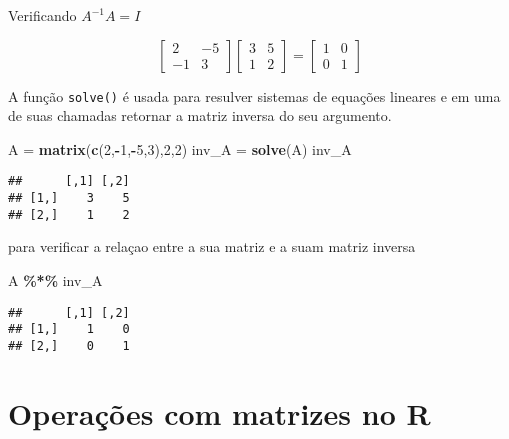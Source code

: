 \documentclass[
]{book}
\newenvironment{Shaded}{\begin{snugshade}}{\end{snugshade}}
\newcommand{\DecValTok}[1]{\textcolor[rgb]{0.00,0.00,0.81}{#1}}
\newcommand{\KeywordTok}[1]{\textcolor[rgb]{0.13,0.29,0.53}{\textbf{#1}}}
\newcommand{\NormalTok}[1]{#1}
\newcommand{\OperatorTok}[1]{\textcolor[rgb]{0.81,0.36,0.00}{\textbf{#1}}}
\newcommand{\StringTok}[1]{\textcolor[rgb]{0.31,0.60,0.02}{#1}}
\begin{document}
Verificando \(A^{-1}A=I\)

\begin{equation*}
\begin{bmatrix}
 2 & -5\\
-1 &  3
\end{bmatrix}
\begin{bmatrix}
 3 & 5\\
 1 & 2
\end{bmatrix}=
\begin{bmatrix}
1 & 0 \\
0 & 1 
\end{bmatrix}
\end{equation*}

A função \texttt{solve()} é usada para resulver sistemas de equações lineares e em uma de suas chamadas retornar a matriz inversa do seu argumento.

\begin{Shaded}
\begin{Highlighting}[]
\NormalTok{A =}\StringTok{ }\KeywordTok{matrix}\NormalTok{(}\KeywordTok{c}\NormalTok{(}\DecValTok{2}\NormalTok{,}\OperatorTok{{-}}\DecValTok{1}\NormalTok{,}\OperatorTok{{-}}\DecValTok{5}\NormalTok{,}\DecValTok{3}\NormalTok{),}\DecValTok{2}\NormalTok{,}\DecValTok{2}\NormalTok{)}
\NormalTok{inv\_A =}\StringTok{ }\KeywordTok{solve}\NormalTok{(A)}
\NormalTok{inv\_A}
\end{Highlighting}
\end{Shaded}

\begin{verbatim}
##      [,1] [,2]
## [1,]    3    5
## [2,]    1    2
\end{verbatim}

para verificar a relaçao entre a sua matriz e a suam matriz inversa

\begin{Shaded}
\begin{Highlighting}[]
\NormalTok{A }\OperatorTok{\%*\%}\StringTok{ }\NormalTok{inv\_A}
\end{Highlighting}
\end{Shaded}

\begin{verbatim}
##      [,1] [,2]
## [1,]    1    0
## [2,]    0    1
\end{verbatim}

\hypertarget{operauxe7uxf5es-com-matrizes-no-r}{%
\section{Operações com matrizes no R}\label{operauxe7uxf5es-com-matrizes-no-r}}
\end{document}
